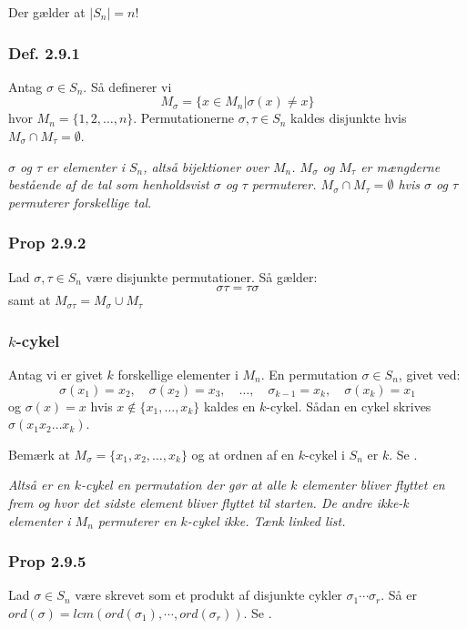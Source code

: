 Der gælder at $|S_n| = n!$

\subsubsection{Def. 2.9.1}
Antag $\sigma \in S_n$. Så definerer vi
\begin{equation*}
  M_\sigma = \{x \in M_n | \sigma(x) \neq x\}
\end{equation*}
hvor $M_n = \{ 1, 2, \ldots, n \}$. Permutationerne $\sigma, \tau \in S_n$
kaldes disjunkte hvis $M_\sigma \cap M_\tau = \emptyset$.

\textit{$\sigma$ og $\tau$ er elementer i $S_n$, altså bijektioner over $M_n$.
$M_\sigma$ og $M_\tau$ er mængderne bestående af de tal som henholdsvist
$\sigma$ og $\tau$ permuterer. $M_\sigma \cap M_\tau = \emptyset$ hvis $\sigma$
og $\tau$ permuterer forskellige tal}.

\subsubsection{Prop 2.9.2}
Lad $\sigma, \tau \in S_n$ være disjunkte permutationer. Så gælder:
\begin{equation*}
  \sigma \tau = \tau \sigma
\end{equation*}
samt at $M_{\sigma\tau} = M_\sigma \cup M_\tau$

\subsubsection{$k$-cykel}
\label{$k$-cykel}
Antag vi er givet $k$ forskellige elementer i $M_n$. En permutation $\sigma \in
S_n$, givet ved:
\begin{equation*}
  \sigma(x_1) = x_2, \quad \sigma(x_2) = x_3, \quad \ldots, \quad \sigma_{k-1} =
  x_k, \quad \sigma(x_k) = x_1
\end{equation*}
og $\sigma(x) = x$ hvis $x \nin \{x_1,\ldots,x_k\}$ kaldes en $k$-cykel. Sådan
en cykel skrives $\sigma(x_1 x_2 \ldots x_k)$.

Bemærk at $M_\sigma = \{x_1, x_2, \ldots, x_k \}$ og at ordnen af en $k$-cykel i
$S_n$ er $k$. Se .

\textit{Altså er en $k$-cykel en permutation der gør at alle $k$ elementer bliver
flyttet en frem og hvor det sidste element bliver flyttet til starten. De
andre ikke-k elementer i $M_n$ permuterer en $k$-cykel ikke. Tænk linked
list.}
 
\subsubsection{Prop 2.9.5}
Lad $\sigma \in S_n$ være skrevet som et produkt af disjunkte cykler $\sigma_1
\cdots \sigma_r$. Så er $ord(\sigma) = lcm(ord(\sigma_1), \cdots,
ord(\sigma_r))$. Se .

